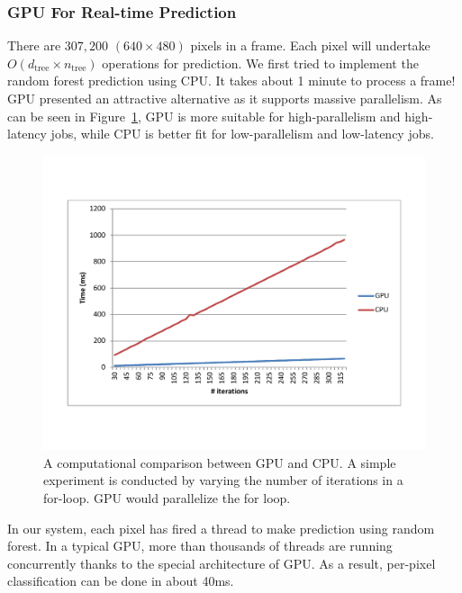 \cutsection
\subsubsection{GPU For Real-time Prediction}
\cutsection
There are $307,200$ $(640\times 480)$ pixels in a frame. Each pixel will undertake $O(d_{\text{tree}}\times n_{\text{tree}})$ operations for prediction. We first tried to implement the random forest prediction using CPU. It takes about 1 minute to process a frame! GPU presented an attractive alternative as it supports massive parallelism. As can be seen in Figure~\ref{fig: GPUvsCPU}, GPU is more suitable for high-parallelism and high-latency jobs, while CPU is better fit for low-parallelism and low-latency jobs.

\begin{figure}
	\includegraphics[width=0.45 \textwidth]{fig/GPUvsCPU.pdf}
    \caption{A computational comparison between GPU and CPU. A simple experiment is conducted by varying the number of iterations in a for-loop. GPU would parallelize the for loop.}
    \label{fig: GPUvsCPU}
\end{figure}

In our system, each pixel has fired a thread to make prediction using random forest. In a typical GPU, more than thousands of threads are running concurrently thanks to the special architecture of GPU. As a result, per-pixel classification can be done in about 40ms.
